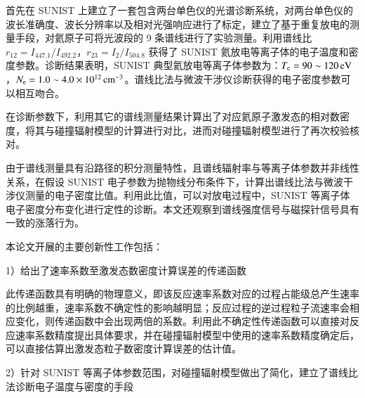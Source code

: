 首先在 SUNIST 上建立了一套包含两台单色仪的光谱诊断系统，对两台单色仪的波长准确度、波长分辨率以及相对光强响应进行了标定，建立了基于重复放电的测量手段，对氦原子可将光波段的 9 条谱线进行了实验测量。利用谱线比 $r_{12}=I_{447.1}/I_{492.2}$，$r_{23}=I_{2}/I_{504.8}$ 获得了 SUNIST 氦放电等离子体的电子温度和密度参数。诊断结果表明，SUNIST 典型氦放电等离子体参数为：$T_{\rm e}=90\sim120\,{\rm eV}$，$N_{\rm e}=1.0\sim4.0\times 10^{12}\,{\rm cm}^{-3}$。谱线比法与微波干涉仪诊断获得的电子密度参数可以相互吻合。

在诊断参数下，利用其它的谱线测量结果计算出了对应氦原子激发态的相对数密度，将其与碰撞辐射模型的计算进行对比，进而对碰撞辐射模型进行了再次校验核对。

由于谱线测量具有沿路径的积分测量特性，且谱线辐射率与等离子体参数并非线性关系，在假设 SUNIST 电子参数为抛物线分布条件下，计算出谱线比法与微波干涉仪测量的电子密度比值。利用此比值，可以对放电过程中，SUNIST 等离子体电子密度分布变化进行定性的诊断。本文还观察到谱线强度信号与磁探针信号具有一致的涨落行为。

本论文开展的主要创新性工作包括：

1）给出了速率系数至激发态数密度计算误差的传递函数

此传递函数具有明确的物理意义，即该反应速率系数对应的过程占能级总产生速率的比例越重，速率系数不确定性的影响越明显；反应过程的逆过程粒子流速率会相应变化，则传递函数中会出现两倍的系数。利用此不确定性传递函数可以直接对反应速率系数精度提出具体要求，并在碰撞辐射模型中使用的速率系数精度确定后，可以直接估算出激发态粒子数密度计算误差的估计值。

2）针对 SUNIST 等离子体参数范围，对碰撞辐射模型做出了简化，建立了谱线比法诊断电子温度与密度的手段%

